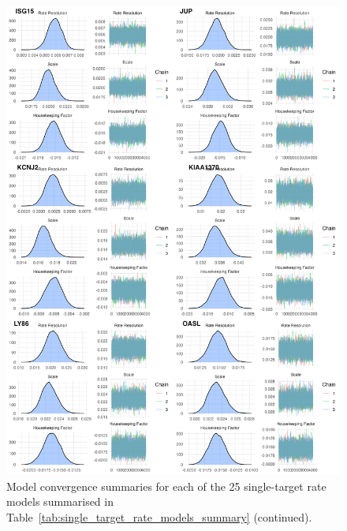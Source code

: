 \documentclass[../thesis.tex]{subfiles}
\begin{document}
\begin{figure}
    \centering
    \includegraphics[width=\textwidth]{figures/chapter2/model_summaries_7.png}
    \caption{Model convergence summaries for each of the 25 single-target rate models summarised in Table~\ref{tab:single_target_rate_models_summary} (continued).}
    \label{fig:convergence_7}
\end{figure}
\end{document}
